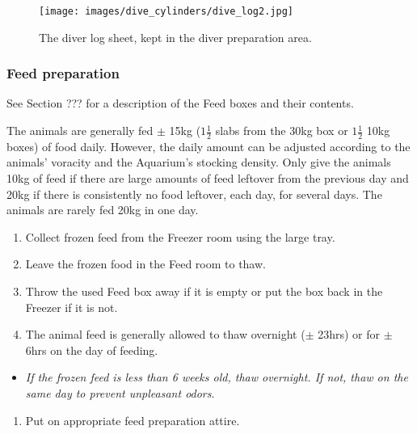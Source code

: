 \documentclass[
  letterpaper,
  DIV=11,
  numbers=noendperiod]{scrreprt}
\providecommand{\tightlist}{%
  \setlength{\itemsep}{0pt}\setlength{\parskip}{0pt}}\usepackage{longtable,booktabs,array}
\begin{document}
\begin{figure}[H]

{\centering \texttt{[image: images/dive\_cylinders/dive\_log2.jpg]}

}

\caption{\label{fig-dive-log}The diver log sheet, kept in the diver
preparation area.}

\end{figure}

\hypertarget{feed-preparation}{%
\subsubsection{Feed preparation}\label{feed-preparation}}

{See Section ??? for a description of the Feed boxes and their
contents}.

The animals are generally fed \(\pm\) 15kg (\(1\frac{1}{2}\) slabs from
the 30kg box or \(1\frac{1}{2}\) 10kg boxes) of food daily. However, the
daily amount can be adjusted according to the animals' voracity and the
Aquarium's stocking density. Only give the animals 10kg of feed if there
are large amounts of feed leftover from the previous day and 20kg if
there is consistently no food leftover, each day, for several days. The
animals are rarely fed 20kg in one day.

\begin{enumerate}
\def\labelenumi{\arabic{enumi}.}
\tightlist
\item
  Collect frozen feed from the Freezer room using the large tray.
\item
  Leave the frozen food in the Feed room to thaw.
\item
  Throw the used Feed box away if it is empty or put the box back in the
  Freezer if it is not.
\item
  The animal feed is generally allowed to thaw overnight (\(\pm\) 23hrs)
  or for \(\pm\) 6hrs on the day of feeding.
\end{enumerate}

\begin{itemize}
\tightlist
\item
  \emph{If the frozen feed is less than 6 weeks old, thaw overnight. If
  not, thaw on the same day to prevent unpleasant odors}.
\end{itemize}

\begin{enumerate}
\def\labelenumi{\arabic{enumi}.}
\setcounter{enumi}{4}
\tightlist
\item
  Put on appropriate feed preparation attire.
\end{enumerate}
\end{document}
